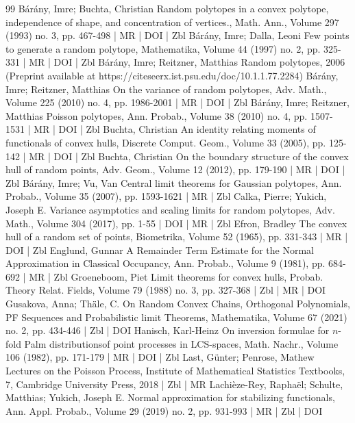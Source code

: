 \documentclass[10pt]{amsart}
\theoremstyle{definition}\newtheorem{defi}[theo]{Definition}\newtheorem{rema}[theo]{Remark}\newtheorem{exam}[theo]{Example}\newtheorem{exem}[theo]{Example}\newtheorem{nota}[theo]{Notation}
\begin{document}
\begin{thebibliography}{99}
 Bárány, Imre; Buchta, Christian Random polytopes in a convex polytope, independence of shape, and concentration of vertices., Math. Ann., Volume 297 (1993) no. 3, pp. 467-498 | MR | DOI | Zbl
 Bárány, Imre; Dalla, Leoni Few points to generate a random polytope, Mathematika, Volume 44 (1997) no. 2, pp. 325-331 | MR | DOI | Zbl
 Bárány, Imre; Reitzner, Matthias Random polytopes, 2006 (Preprint available at https://citeseerx.ist.psu.edu/doc/10.1.1.77.2284)
 Bárány, Imre; Reitzner, Matthias On the variance of random polytopes, Adv. Math., Volume 225 (2010) no. 4, pp. 1986-2001 | MR | DOI | Zbl
 Bárány, Imre; Reitzner, Matthias Poisson polytopes, Ann. Probab., Volume 38 (2010) no. 4, pp. 1507-1531 | MR | DOI | Zbl
 Buchta, Christian An identity relating moments of functionals of convex hulls, Discrete Comput. Geom., Volume 33 (2005), pp. 125-142 | MR | DOI | Zbl
 Buchta, Christian On the boundary structure of the convex hull of random points, Adv. Geom., Volume 12 (2012), pp. 179-190 | MR | DOI | Zbl
 Bárány, Imre; Vu, Van Central limit theorems for Gaussian polytopes, Ann. Probab., Volume 35 (2007), pp. 1593-1621 | MR | Zbl
 Calka, Pierre; Yukich, Joseph E. Variance asymptotics and scaling limits for random polytopes, Adv. Math., Volume 304 (2017), pp. 1-55 | DOI | MR | Zbl
 Efron, Bradley The convex hull of a random set of points, Biometrika, Volume 52 (1965), pp. 331-343 | MR | DOI | Zbl
 Englund, Gunnar A Remainder Term Estimate for the Normal Approximation in Classical Occupancy, Ann. Probab., Volume 9 (1981), pp. 684-692 | MR | Zbl
 Groeneboom, Piet Limit theorems for convex hulls, Probab. Theory Relat. Fields, Volume 79 (1988) no. 3, pp. 327-368 | Zbl | MR | DOI
 Gusakova, Anna; Thäle, C. On Random Convex Chains, Orthogonal Polynomials, PF Sequences and Probabilistic limit Theorems, Mathematika, Volume 67 (2021) no. 2, pp. 434-446 | Zbl | DOI
 Hanisch, Karl-Heinz On inversion formulae for $n$-fold Palm distributionsof point processes in LCS-spaces, Math. Nachr., Volume 106 (1982), pp. 171-179 | MR | DOI | Zbl
 Last, Günter; Penrose, Mathew Lectures on the Poisson Process, Institute of Mathematical Statistics Textbooks, 7, Cambridge University Press, 2018 | Zbl | MR
 Lachièze-Rey, Raphaël; Schulte, Matthias; Yukich, Joseph E. Normal approximation for stabilizing functionals, Ann. Appl. Probab., Volume 29 (2019) no. 2, pp. 931-993 | MR | Zbl | DOI

\end{thebibliography}
\end{document}
